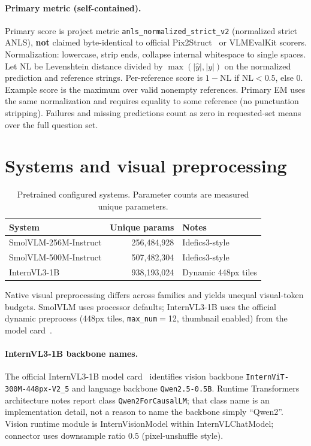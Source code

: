 \documentclass[11pt,a4paper]{article}
\begin{document}
\paragraph{Primary metric (self-contained).}
Primary score is project metric \texttt{anls\_normalized\_strict\_v2} (normalized strict ANLS), \textbf{not} claimed byte-identical to official Pix2Struct~\citep{lee2023pix2struct} or VLMEvalKit scorers.
Normalization: lowercase, strip ends, collapse internal whitespace to single spaces.
Let $\mathrm{NL}$ be Levenshtein distance divided by $\max(|\hat{y}|,|y|)$ on the normalized prediction and reference strings.
Per-reference score is $1-\mathrm{NL}$ if $\mathrm{NL}<0.5$, else $0$.
Example score is the maximum over valid nonempty references.
Primary EM uses the same normalization and requires equality to some reference (no punctuation stripping).
Failures and missing predictions count as zero in requested-set means over the full question set.

\section{Systems and visual preprocessing}

\begin{table}[H]
\centering
\caption{Pretrained configured systems. Parameter counts are measured unique parameters.}
\label{tab:systems}
\begin{tabular}{@{}lrl@{}}
\toprule
System & Unique params & Notes \\
\midrule
SmolVLM-256M-Instruct & 256{,}484{,}928 & Idefics3-style \\
SmolVLM-500M-Instruct & 507{,}482{,}304 & Idefics3-style \\
InternVL3-1B & 938{,}193{,}024 & Dynamic 448px tiles \\
\bottomrule
\end{tabular}
\end{table}

Native visual preprocessing differs across families and yields unequal visual-token budgets.
SmolVLM uses processor defaults; InternVL3-1B uses the official dynamic preprocess (448px tiles, \texttt{max\_num}${}={}$12, thumbnail enabled) from the model card~\citep{opengvlab2025internvl3_1b_card}.

\paragraph{InternVL3-1B backbone names.}
The official InternVL3-1B model card~\citep{opengvlab2025internvl3_1b_card} identifies vision backbone \texttt{InternViT-300M-448px-V2\_5} and language backbone \texttt{Qwen2.5-0.5B}.
Runtime Transformers architecture notes report class \texttt{Qwen2ForCausalLM}; that class name is an implementation detail, not a reason to name the backbone simply ``Qwen2''.
Vision runtime module is InternVisionModel within InternVLChatModel; connector uses downsample ratio $0.5$ (pixel-unshuffle style).
\end{document}

